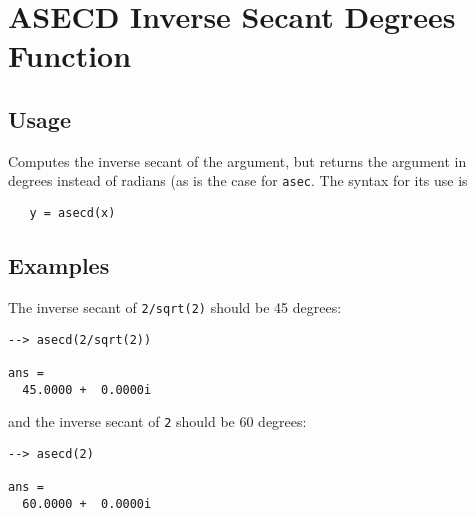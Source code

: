 \section{ASECD Inverse Secant Degrees Function}

\subsection{Usage}

Computes the inverse secant of the argument, but returns
the argument in degrees instead of radians (as is the case
for \verb|asec|. The syntax for its use is
\begin{verbatim}
   y = asecd(x)
\end{verbatim}
\subsection{Examples}

The inverse secant of \verb|2/sqrt(2)| should be 45 degrees:
\begin{verbatim}
--> asecd(2/sqrt(2))

ans = 
  45.0000 +  0.0000i 
\end{verbatim}
and the inverse secant of \verb|2| should be 60 degrees:
\begin{verbatim}
--> asecd(2)

ans = 
  60.0000 +  0.0000i 
\end{verbatim}
